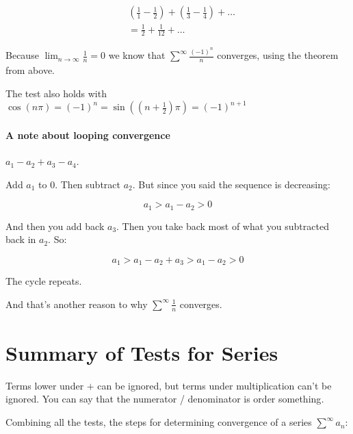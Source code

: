 \documentclass[12pt]{article}
\theoremstyle{plain}
\theoremstyle{remark}
\theoremstyle{definition}
\begin{document}
\begin{align*}
&\left( \frac{1}{1} - \frac{1}{2} \right) + \left( \frac{1}{3} - \frac{1}{4} \right) + \ldots \\
&= \frac{1}{2} + \frac{1}{12} + \ldots
\end{align*}


Because \(\lim_{n \rightarrow \infty}\frac{1}{n} = 0\) we know that
\(\sum_{}^{\infty}\frac{( - 1)^{n}}{n}\) converges, using the theorem
from above.

The test also holds with
\(\cos\left( n\pi  \right) = ( - 1)^{n} = \sin\left( \left( n + \frac{1}{2} \right)\pi \right) = ( - 1)^{n + 1}\)


\paragraph{A note about looping
convergence}

\(a_{1} - a_{2} + a_{3} - a_{4}\).

Add \(a_{1}\) to 0. Then subtract \(a_{2}\). But since you said the
sequence is decreasing:

\[a_{1} > a_{1} - a_{2} > 0\]

And then you add back \(a_{3}\). Then you take back most of what you
subtracted back in \(a_{2}\). So:

\[a_{1} > a_{1} - a_{2} + a_{3} > a_{1} - a_{2} > 0\]

The cycle repeats.


And that's another reason to why \(\sum_{}^{\infty}\frac{1}{n}\)
converges.


\section{Summary of Tests for
Series}

Terms lower under \(+\) can be ignored, but terms under multiplication
can't be ignored. You can say that the numerator / denominator is order
something\emph{.}

Combining all the tests, the steps for determining convergence of a
series \(\sum_{}^{\infty}a_{n}\):
\end{document}
